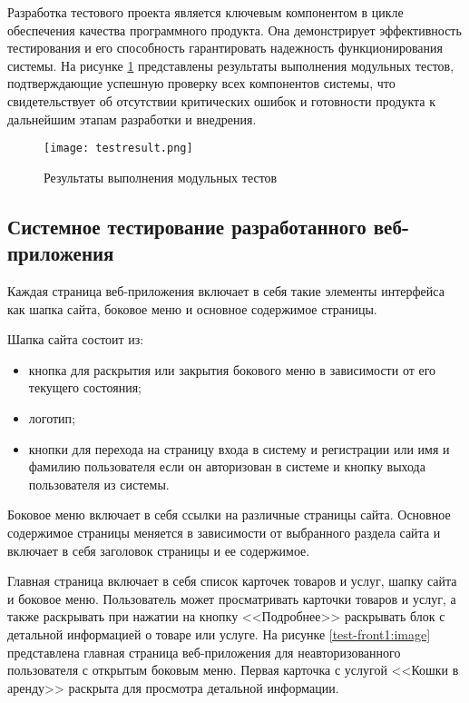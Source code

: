 Разработка тестового проекта является ключевым компонентом в цикле обеспечения качества программного продукта. Она демонстрирует эффективность тестирования и его способность гарантировать надежность функционирования системы. На рисунке \ref{testresult:image} представлены результаты выполнения модульных тестов, подтверждающие успешную проверку всех компонентов системы, что свидетельствует об отсутствии критических ошибок и готовности продукта к дальнейшим этапам разработки и внедрения.

\newpage %
\begin{figure}[H] %
\centering
\texttt{[image: testresult.png]}
\caption{Результаты выполнения модульных тестов}
\label{testresult:image}
\end{figure}

\subsection{Системное тестирование разработанного веб-приложения}

Каждая страница веб-приложения включает в себя такие элементы интерфейса как шапка сайта, боковое меню и основное содержимое страницы.

Шапка сайта состоит из:
\begin{itemize}
    \item кнопка для раскрытия или закрытия бокового меню в зависимости от его текущего состояния;
    \item логотип;
    \item кнопки для перехода на страницу входа в систему и регистрации или имя и фамилию пользователя если он авторизован в системе и кнопку выхода пользователя из системы.
\end{itemize}

Боковое меню включает в себя ссылки на различные страницы сайта.
Основное содержимое страницы меняется в зависимости от выбранного раздела сайта и включает в себя заголовок страницы и ее содержимое. 

Главная страница включает в себя список карточек товаров и услуг, шапку сайта и боковое меню. Пользователь может просматривать карточки товаров и услуг, а также раскрывать при нажатии на кнопку <<Подробнее>> раскрывать блок с детальной информацией о товаре или услуге.
На рисунке \ref{test-front1:image} представлена главная страница веб-приложения для неавторизованного пользователя с открытым боковым меню. Первая карточка с услугой <<Кошки в аренду>> раскрыта для просмотра детальной информации.

